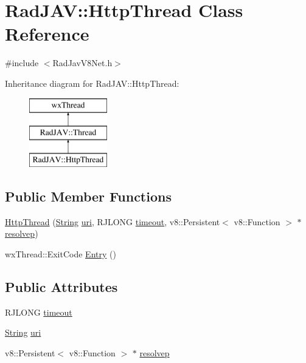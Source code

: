 \hypertarget{class_rad_j_a_v_1_1_http_thread}{}\section{Rad\+J\+AV\+:\+:Http\+Thread Class Reference}
\label{class_rad_j_a_v_1_1_http_thread}


{\ttfamily \#include $<$Rad\+Jav\+V8\+Net.\+h$>$}

Inheritance diagram for Rad\+J\+AV\+:\+:Http\+Thread\+:\begin{figure}[H]
\begin{center}
\leavevmode
\includegraphics[height=3.000000cm]{class_rad_j_a_v_1_1_http_thread}
\end{center}
\end{figure}
\subsection*{Public Member Functions}
\begin{DoxyCompactItemize}
\item 
\mbox{\hyperlink{class_rad_j_a_v_1_1_http_thread_ac5bc26360698d376783e61f5359275e2}{Http\+Thread}} (\mbox{\hyperlink{class_rad_j_a_v_1_1_string}{String}} \mbox{\hyperlink{class_rad_j_a_v_1_1_http_thread_a29766f8c3f2c86f3122e18a8aa757174}{uri}}, R\+J\+L\+O\+NG \mbox{\hyperlink{class_rad_j_a_v_1_1_http_thread_a491f21d7a22f120890ed87e258352a48}{timeout}}, v8\+::\+Persistent$<$ v8\+::\+Function $>$ $\ast$\mbox{\hyperlink{class_rad_j_a_v_1_1_http_thread_abd9e9b05592f8825bd096442537ce66a}{resolvep}})
\item 
wx\+Thread\+::\+Exit\+Code \mbox{\hyperlink{class_rad_j_a_v_1_1_http_thread_a4c3a9d372fa7ad736918d361df6af681}{Entry}} ()
\end{DoxyCompactItemize}
\subsection*{Public Attributes}
\begin{DoxyCompactItemize}
\item 
R\+J\+L\+O\+NG \mbox{\hyperlink{class_rad_j_a_v_1_1_http_thread_a491f21d7a22f120890ed87e258352a48}{timeout}}
\item 
\mbox{\hyperlink{class_rad_j_a_v_1_1_string}{String}} \mbox{\hyperlink{class_rad_j_a_v_1_1_http_thread_a29766f8c3f2c86f3122e18a8aa757174}{uri}}
\item 
v8\+::\+Persistent$<$ v8\+::\+Function $>$ $\ast$ \mbox{\hyperlink{class_rad_j_a_v_1_1_http_thread_abd9e9b05592f8825bd096442537ce66a}{resolvep}}
\end{DoxyCompactItemize}
